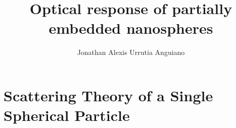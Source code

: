 \documentclass[11pt]{Latex/Classes/PhDthesisPSnPDF}
\author{Jonathan Alexis Urrutia Anguiano}
\title{Optical response of partially embedded nanospheres}
\begin{document}
%
\maketitle
\frontmatter

%
%
%


%
\setcounter{secnumdepth}{3} %
\setcounter{tocdepth}{3}    %

\tableofcontents            %


\mainmatter

\def\baselinestretch{1}                   %



\chapter{Scattering Theory of a Single Spherical Particle}
  \label{ch:OpticalProperties}
\end{document}
